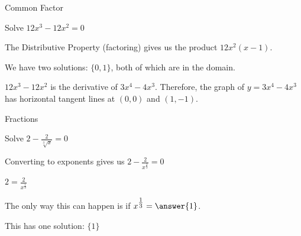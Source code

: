 \documentclass{ximera}
\begin{document}
\begin{example}  Common Factor


Solve $12 x^3 - 12 x^2 = 0 $



\begin{explanation}


The Distributive Property (factoring) gives us the product $12 x^2 (x-1)$.




We have two solutions: $\{ 0, 1  \}$, both of which are in the domain.


\end{explanation}


$12 x^3 - 12 x^2$ is the derivative of $3x^4 - 4x^3$.  Therefore, the graph of $y = 3x^4 - 4x^3$ has horizontal tangent lines at $(0, 0)$ and $(1, -1)$.





\begin{center}
\end{center}


\end{example}





















\begin{example}  Fractions


Solve $2 - \frac{2}{\sqrt[3]{x}} = 0$



\begin{explanation}


Converting to exponents gives us $2 - \frac{2}{x^{\tfrac{1}{3}}} = 0$


$2 = \frac{2}{x^{\tfrac{1}{3}}}$

The only way this can happen is if $x^{\tfrac{1}{3}} = \answer{1}$.

This has one solution: $\{  1  \}$





\end{explanation}


\end{example}
\end{document}
